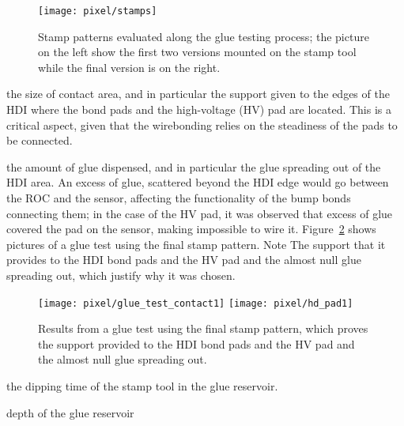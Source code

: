 \begin{figure}[!h]
  \centering  
  \texttt{[image: pixel/stamps]} 
  \caption[Stamp patterns]{Stamp patterns evaluated along the glue testing process; the picture on the left show the first two versions mounted on the stamp tool while the final version is on the right.}\label{fig:stamp_pattern}
\end{figure}

\bit
\item the size of contact area, and in particular the support given to the edges of the HDI where the bond pads and the high-voltage (HV) pad are located. This is a critical aspect, given that the wirebonding relies on the steadiness of the pads to be connected.   
\item the amount of glue dispensed, and in particular the glue spreading out of the HDI area. An excess of glue, scattered beyond the HDI edge would go between the ROC and the sensor, affecting the functionality of the bump bonds connecting them; in the case of the HV pad, it was observed that excess of glue covered the pad on the sensor, making impossible to wire it. Figure~\ref{fig:glue_test} shows pictures of a glue test using the final stamp pattern. Note The support that it provides to the HDI bond pads and the HV pad and the almost null glue spreading out, which justify why it was chosen. 

\begin{figure}[!h]
  \centering  
  \texttt{[image: pixel/glue\_test\_contact1]}
  \texttt{[image: pixel/hd\_pad1]}
  \caption[Glue contact area test.]{Results from a glue test using the final stamp pattern, which proves the support provided to the HDI bond pads and the HV pad and the almost null glue spreading out.}\label{fig:glue_test}
\end{figure}



























\item the dipping time of the stamp tool in the glue reservoir. 
\item depth of the glue reservoir

